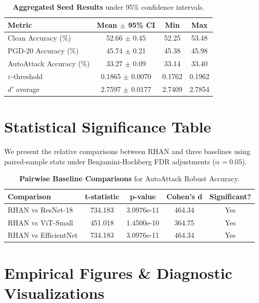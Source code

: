 \documentclass[11pt,a4paper]{article}
\begin{document}
\begin{table}[H]
\centering
\caption{\textbf{Aggregated Seed Results} under 95\% confidence intervals.}
\label{tab:aggregated_seeds}
\begin{tabular}{l c c c}
\toprule
\textbf{Metric} & \textbf{Mean $\pm$ 95\% CI} & \textbf{Min} & \textbf{Max} \\
\midrule
Clean Accuracy (\%) & 52.66 $\pm$ 0.45 & 52.25 & 53.48 \\
PGD-20 Accuracy (\%) & 45.74 $\pm$ 0.21 & 45.38 & 45.98 \\
AutoAttack Accuracy (\%) & 33.27 $\pm$ 0.09 & 33.14 & 33.40 \\
$\varepsilon$-threshold & 0.1865 $\pm$ 0.0070 & 0.1762 & 0.1962 \\
$d'$ average & 2.7597 $\pm$ 0.0177 & 2.7409 & 2.7854 \\
\bottomrule
\end{tabular}
\end{table}

\section{Statistical Significance Table}
We present the relative comparisons between RHAN and three baselines using paired-sample stats under Benjamini-Hochberg FDR adjustments ($\alpha=0.05$).

\begin{table}[H]
\centering
\caption{\textbf{Pairwise Baseline Comparisons} for AutoAttack Robust Accuracy.}
\label{tab:stats_table}
\begin{tabular}{l c c c c}
\toprule
\textbf{Comparison} & \textbf{t-statistic} & \textbf{p-value} & \textbf{Cohen's d} & \textbf{Significant?} \\
\midrule
RHAN vs ResNet-18 & 734.183 & 3.0976e-11 & 464.34 & Yes \\
RHAN vs ViT-Small & 451.018 & 1.4500e-10 & 364.75 & Yes \\
RHAN vs EfficientNet & 734.183 & 3.0976e-11 & 464.34 & Yes \\
\bottomrule
\end{tabular}
\end{table}

\clearpage

\section{Empirical Figures \& Diagnostic Visualizations}
\end{document}
